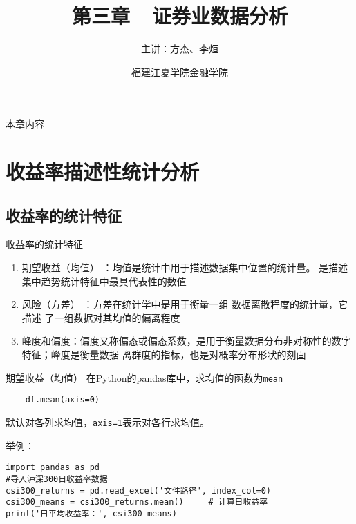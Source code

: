 \documentclass[t]{beamer}
\begin{document}
\fontsize{11}{18}\selectfont


\CTEXindent


\title{第三章~~证券业数据分析}

\author{主讲：方杰、李烜}
\date{福建江夏学院金融学院}

\maketitle

\begin{frame}[fragile]{本章内容}
\begin{multicols*}{2}
    \tableofcontents
    
\end{multicols*}

\end{frame}


\section{收益率描述性统计分析}
\subsection{收益率的统计特征}


\begin{frame}[fragile]{收益率的统计特征}
\begin{enumerate}
    \item 期望收益（均值） ：均值是统计中用于描述数据集中位置的统计量。
    是描述集中趋势统计特征中最具代表性的数值
    \item  风险（方差） ：方差在统计学中是用于衡量一组
    数据离散程度的统计量，它描述
    了一组数据对其均值的偏离程度
    \item   峰度和偏度：偏度又称偏态或偏态系数，是用于衡量数据分布非对称性的数字特征；峰度是衡量数据
    离群度的指标，也是对概率分布形状的刻画
\end{enumerate}
\end{frame}




\begin{frame}[fragile]{期望收益（均值）}
    在Python的pandas库中，求均值的函数为\verb|mean|
\begin{lstlisting}
    df.mean(axis=0)
\end{lstlisting}

默认对各列求均值，\verb|axis=1|表示对各行求均值。
\begin{block}{举例：}
    \begin{lstlisting}
import pandas as pd 
#导入沪深300日收益率数据
csi300_returns = pd.read_excel('文件路径', index_col=0) 
csi300_means = csi300_returns.mean()     # 计算日收益率
print('日平均收益率：', csi300_means)
\end{lstlisting}
\end{block}
\end{frame}
\end{document}
